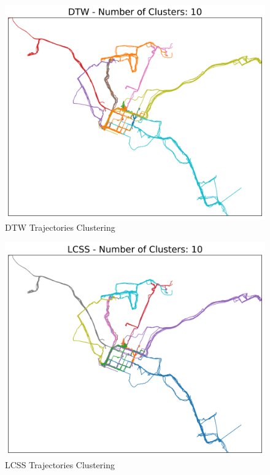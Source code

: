 \documentclass[a4paper, 12pt]{article}
\begin{document}
\begin{figure}[htbp!]
    \centering
    \includegraphics[width=1\textwidth]{dtw_trajectory_clustering.png}
    \caption{DTW Trajectories Clustering}
    \label{fig20}
\end{figure}

\begin{figure}[htbp!]
    \centering
    \includegraphics[width=1\textwidth]{lcss_trajectory_clustering.png}
    \caption{LCSS Trajectories Clustering}
    \label{fig21}
\end{figure}
\end{document}
